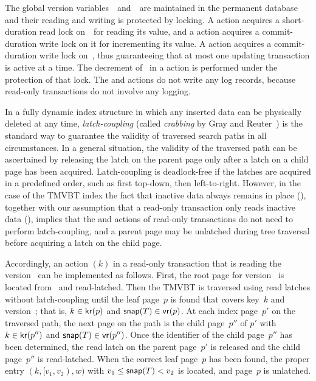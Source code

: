 The global version variables~\comver\ and~\actver\ are maintained
in the permanent database and their reading and writing is protected
by locking. 
A  action acquires a short-duration read lock
on~\comver\ for reading its value, and a 
action acquires a commit-duration write lock on it for incrementing
its value. 
A  action acquires a commit-duration write lock
on~\actver, thus guaranteeing that at most one updating
transaction is active at a time.
The decrement of \actver\ in a  action 
is performed under the protection of that lock.
The  and  actions do not
write any log records, because read-only transactions do not involve any
logging.

In a fully dynamic index structure in which any inserted data can be
physically deleted at any time,
\emph{latch-coupling} (called \emph{crabbing} by Gray and
Reuter~\cite{gray:1993:transactionprocessing}) is the standard way to
guarantee the validity of traversed search paths in all circumstances.
In a general situation, the validity of the traversed path can be
ascertained by releasing the latch on the parent page only after
a latch on a child page has been acquired.
Latch-coupling is deadlock-free if the latches are acquired in a
predefined order, such as first top-down, then left-to-right.
However, in the case of the TMVBT index the fact that
inactive data always remains in place
(), together with our assumption
that a read-only transaction only reads inactive data
(), implies that the  and
 actions of read-only transactions do not need to perform
latch-coupling, and a parent page may be unlatched during tree traversal
before acquiring a latch on the child page.

Accordingly, an action $(k)$ in a read-only transaction
that is reading the version~ can be implemented as follows.
First, the root page for version~ is located from \rootstar\ and
read-latched.
Then the TMVBT is traversed using read latches without latch-coupling until
the leaf page~$p$ is found that covers key~$k$ and version~; that
is, $k \in \text{\textsf{kr}}(p)$ and $\text{\textsf{snap}}(T) \in \text{\textsf{vr}}(p)$. 
At each index page~$p'$ on the traversed path, the next page on the
path is the child page~$p''$ of $p'$ with $k \in \text{\textsf{kr}}(p'')$ and $\text{\textsf{snap}}(T) \in
\text{\textsf{vr}}(p'')$. 
Once the identifier of the child page~$p''$ has been determined, the read latch
on the parent page~$p'$ is released and the child page~$p''$ is read-latched.
When the correct leaf page~$p$ has been found, the proper entry $(k, [v_1,v_2),
w)$ with $v_1 \leq \text{\textsf{snap}}(T) < v_2$ is located, and page~$p$ is unlatched.

